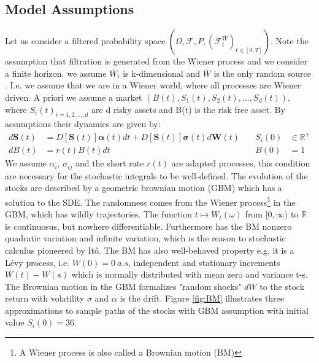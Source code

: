 \subsection{Model Assumptions}
Let us consider a filtered probability space $(\Omega, \mathcal{F}, P, (\mathcal{F}_t^{\bar{W}})_{t \in [0,T]})$. Note the assumption that filtration is generated from the Wiener process and we consider a finite horizon. we assume $\bar{W}_i$ is k-dimensional and $\bar{W}$ is the only random source . I.e. we assume that we are in a Wiener world, where all processes are Wiener driven. A priori we assume a market $(B(t),S_1(t), S_2(t),\ldots, S_d(t))$, where ${S_i(t)}_{i=1,2,\ldots,d}$ are d risky assets and B(t) is the risk free asset. By assumptions their dynamics are given by:\\
\begin{align}
d\bm{S}(t)&=D[\bm{S}(t)]\bm{\alpha}(t)dt+D[\bm{S}(t)]\bm{\sigma}(t)d\bar{\bm{W}}(t) \quad & S_i(0) &\in \mathbb{R}^+ \label{GBM-P} \\
dB(t)&=r(t)B(t)dt \quad & B(0) &= 1
\end{align}
We assume $\alpha_i$, $\sigma_{ij}$ and the short rate $r(t)$ are adapted processes, this condition are necessary for the stochastic integrals to be well-defined. The evolution of the stocks are described by a geometric brownian motion (GBM) which has a solution to the SDE. The randomness comes from the Wiener process\footnote{A Wiener process is also called a Brownian motion (BM)} in the GBM, which has wildly trajectories. The function $t\mapsto W_{t}(\omega)$ from $[0,\infty)$ to $\mathbb{R}$ is continuosus, but nowhere differentiable. Furthermore has the BM nonzero quadratic variation and infinite variation, which is the reason to stochastic calculus pioneered by Itô. The BM has also well-behaved property e.g. it is a Lévy process, i.e. $W(0)=0 \ a.s$, independent and stationary increments $W(t)-W(s)$ which is normally distributed with mean zero and variance t-s. The Brownian motion in the GBM formalizes "random shocks" $dW$ to the stock return with volatility $\sigma$ and $\alpha$ is the drift. Figure \ref{fig:BM} illustrates three approximations to sample paths of the stocks with GBM assumption with initial value $S_{i}(0)=36$.

